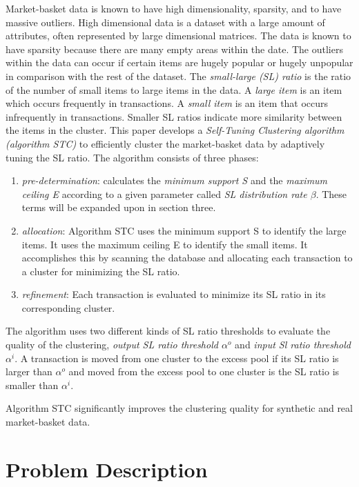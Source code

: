 \documentclass[11pt,reqno]{amsart}
\theoremstyle{definition}
\numberwithin{equation}{subsection}
\begin{document}
Market-basket data is known to have high dimensionality, sparsity, and to have massive outliers. High dimensional data is a dataset with a large amount of attributes, often represented by large dimensional matrices. The data is known to have sparsity because there are many empty areas within the date. The outliers within the data can occur if certain items are hugely popular or hugely unpopular in comparison with the rest of the dataset.  The {\em small-large (SL) ratio} is the ratio of the number of small items to large items in the data.  A {\em large item} is an item which occurs frequently in transactions. A {\em small item} is an item that occurs infrequently in transactions. Smaller SL ratios indicate more similarity between the items in the cluster. This paper develops a {\em Self-Tuning Clustering algorithm (algorithm STC)} to efficiently cluster the market-basket data by adaptively tuning the SL ratio. The algorithm consists of three phases:
	\begin{enumerate}
		\item {\em pre-determination}: calculates the {\em minimum support S} and the {\em maximum ceiling E} according to a given parameter called {\em SL distribution rate $\beta$}. These terms will be expanded upon in section three.
		
		\item {\em allocation}: Algorithm STC uses the minimum support S to identify the large items. It uses the maximum ceiling E to identify the small items. It accomplishes this by scanning the database and allocating each transaction to a cluster for minimizing the SL ratio.
		
		\item {\em refinement}: Each transaction is evaluated to minimize its SL ratio in its corresponding cluster. 
	\end{enumerate}
	
	The algorithm uses two different kinds of SL ratio thresholds to evaluate the quality of the clustering, {\em output SL ratio threshold $\alpha^o$} and {\em input Sl ratio threshold $\alpha^i$}. A transaction is moved from one cluster to the excess pool if its SL ratio is larger than $\alpha^o$ and moved from the excess pool to one cluster is the SL ratio is smaller than $\alpha^i$.
	
Algorithm STC significantly improves the clustering quality for synthetic and real market-basket data. 


\section{Problem Description}
\end{document}
